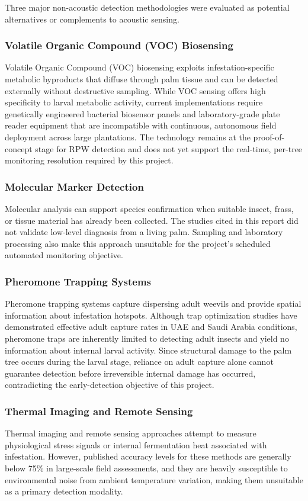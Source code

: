 \documentclass[12pt,a4paper,oneside]{memoir}
\begin{document}
Three major non-acoustic detection methodologies were evaluated as potential alternatives or complements to acoustic sensing.

\subsubsection{Volatile Organic Compound (VOC) Biosensing}
Volatile Organic Compound (VOC) biosensing exploits infestation-specific metabolic byproducts that diffuse through palm tissue and can be detected externally without destructive sampling. While VOC sensing offers high specificity to larval metabolic activity, current implementations require genetically engineered bacterial biosensor panels and laboratory-grade plate reader equipment that are incompatible with continuous, autonomous field deployment across large plantations. The technology remains at the proof-of-concept stage for RPW detection and does not yet support the real-time, per-tree monitoring resolution required by this project.

\subsubsection{Molecular Marker Detection}
Molecular analysis can support species confirmation when suitable insect, frass, or tissue material has already been collected. The studies cited in this report did not validate low-level diagnosis from a living palm. Sampling and laboratory processing also make this approach unsuitable for the project's scheduled automated monitoring objective.

\subsubsection{Pheromone Trapping Systems}
Pheromone trapping systems capture dispersing adult weevils and provide spatial information about infestation hotspots. Although trap optimization studies have demonstrated effective adult capture rates in UAE and Saudi Arabia conditions, pheromone traps are inherently limited to detecting adult insects and yield no information about internal larval activity. Since structural damage to the palm tree occurs during the larval stage, reliance on adult capture alone cannot guarantee detection before irreversible internal damage has occurred, contradicting the early-detection objective of this project.

\subsubsection{Thermal Imaging and Remote Sensing}
Thermal imaging and remote sensing approaches attempt to measure physiological stress signals or internal fermentation heat associated with infestation. However, published accuracy levels for these methods are generally below 75\% in large-scale field assessments, and they are heavily susceptible to environmental noise from ambient temperature variation, making them unsuitable as a primary detection modality.
\end{document}
